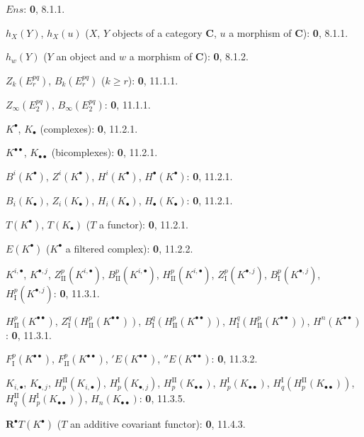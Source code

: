 \begin{flushleft}
$\boldsymbol{\mathit{Ens}}$: \textbf{0}, 8.1.1.

$h_X(Y)$, $h_X(u)$ ($X$, $Y$ objects of a category $\boldsymbol{C}$, $u$ a morphism
of $\boldsymbol{C}$): \textbf{0}, 8.1.1.

$h_w(Y)$ ($Y$ an object and $w$ a morphism of $\boldsymbol{C}$): \textbf{0}, 8.1.2.

$Z_k(E_r^{pq})$, $B_k(E_r^{pq})$ ($k\geq r$): \textbf{0}, 11.1.1.

$Z_\infty(E_2^{pq})$, $B_\infty(E_2^{pq})$: \textbf{0}, 11.1.1.

$K^\bullet$, $K_\bullet$ (complexes): \textbf{0}, 11.2.1.

$K^{\bullet\bullet}$, $K_{\bullet\bullet}$ (bicomplexes): \textbf{0}, 11.2.1.

$B^i(K^\bullet)$, $Z^i(K^\bullet)$, $H^i(K^\bullet)$,
$H^\bullet(K^\bullet)$: \textbf{0}, 11.2.1.

$B_i(K_\bullet)$, $Z_i(K_\bullet)$, $H_i(K_\bullet)$,
$H_\bullet(K_\bullet)$: \textbf{0}, 11.2.1.

$T(K^\bullet)$, $T(K_\bullet)$ ($T$ a functor): \textbf{0}, 11.2.1.

$E(K^\bullet)$ ($K^\bullet$ a filtered complex): \textbf{0}, 11.2.2.

$K^{i,\bullet}$, $K^{\bullet,j}$, $Z_{\mathrm{II}}^p(K^{i,\bullet})$,
$B_{\mathrm{II}}^p(K^{i,\bullet})$, $H_{\mathrm{II}}^p(K^{i,\bullet})$,
$Z_{\mathrm I}^p(K^{\bullet,j})$, $B_{\mathrm I}^p(K^{\bullet,j})$,
$H_{\mathrm I}^p(K^{\bullet,j})$: \textbf{0}, 11.3.1.

$H_{\mathrm{II}}^p(K^{\bullet\bullet})$,
$Z_{\mathrm I}^q(H_{\mathrm{II}}^p(K^{\bullet\bullet}))$,
$B_{\mathrm I}^q(H_{\mathrm{II}}^p(K^{\bullet\bullet}))$,
$H_{\mathrm I}^q(H_{\mathrm{II}}^p(K^{\bullet\bullet}))$,
$H^n(K^{\bullet\bullet})$: \textbf{0}, 11.3.1.

$F_{\mathrm I}^p(K^{\bullet\bullet})$,
$F_{\mathrm{II}}^p(K^{\bullet\bullet})$, ${}'E(K^{\bullet\bullet})$,
${}''E(K^{\bullet\bullet})$: \textbf{0}, 11.3.2.

$K_{i,\bullet}$, $K_{\bullet,j}$, $H_p^{\mathrm{II}}(K_{i,\bullet})$,
$H_p^{\mathrm I}(K_{\bullet,j})$, $H_p^{\mathrm{II}}(K_{\bullet\bullet})$,
$H_p^{\mathrm I}(K_{\bullet\bullet})$,
$H_q^{\mathrm I}(H_p^{\mathrm{II}}(K_{\bullet\bullet}))$,
$H_q^{\mathrm{II}}(H_p^{\mathrm I}(K_{\bullet\bullet}))$,
$H_n(K_{\bullet\bullet})$: \textbf{0}, 11.3.5.

$\mathbf{R}^\bullet T(K^\bullet)$ ($T$ an additive covariant functor): \textbf{0}, 11.4.3.


\end{flushleft}
